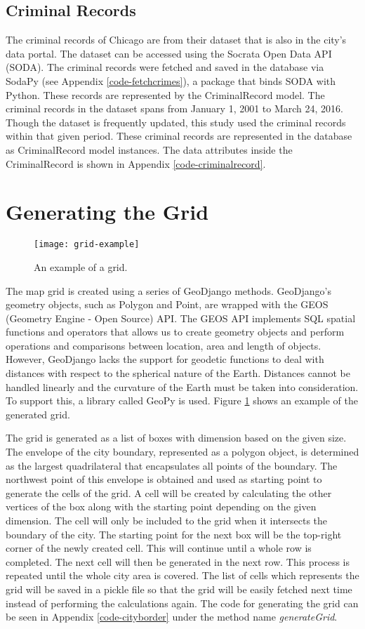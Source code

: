     \subsection{Criminal Records}
        The criminal records of Chicago are from their dataset that is also in the city's data portal. The dataset can be accessed using the Socrata Open Data API (SODA). The criminal records were fetched and saved in the database via SodaPy (see Appendix \ref{code-fetchcrimes}), a package that binds SODA with Python. These records are represented by the CriminalRecord model. The criminal records in the dataset spans from January 1, 2001 to March 24, 2016. Though the dataset is frequently updated, this study used the criminal records within that given period. These criminal records are represented in the database as CriminalRecord model instances. The data attributes inside the CriminalRecord is shown in Appendix \ref{code-criminalrecord}.

\section{Generating the Grid}
    \begin{figure}[H]
    \centering
    \texttt{[image: grid-example]}
    \caption{An example of a grid.}
    \label{fig:grid}
    \end{figure}
    The map grid is created using a series of GeoDjango methods. GeoDjango's geometry objects, such as Polygon and Point, are wrapped with the GEOS (Geometry Engine - Open Source) API. The GEOS API implements SQL spatial functions and operators that allows us to create geometry objects and perform operations and comparisons between location, area and length of objects. However, GeoDjango lacks the support for geodetic functions to deal with distances with respect to the spherical nature of the Earth. Distances cannot be handled linearly and the curvature of the Earth must be taken into consideration. To support this, a library called GeoPy is used. Figure \ref{fig:grid} shows an example of the generated grid.

    The grid is generated as a list of boxes with dimension based on the given size. The envelope of the city boundary, represented as a polygon object, is determined as the largest quadrilateral that encapsulates all points of the boundary. The northwest point of this envelope is obtained and used as starting point to generate the cells of the grid. A cell will be created by calculating the other vertices of the box along with the starting point depending on the given dimension. The cell will only be included to the grid when it intersects the boundary of the city. The starting point for the next box will be the top-right corner of the newly created cell. This will continue until a whole row is completed. The next cell will then be generated in the next row. This process is repeated until the whole city area is covered. The list of cells which represents the grid will be saved in a pickle file so that the grid will be easily fetched next time instead of performing the calculations again. The code for generating the grid can be seen in Appendix \ref{code-cityborder} under the method name \textit{generateGrid}.

